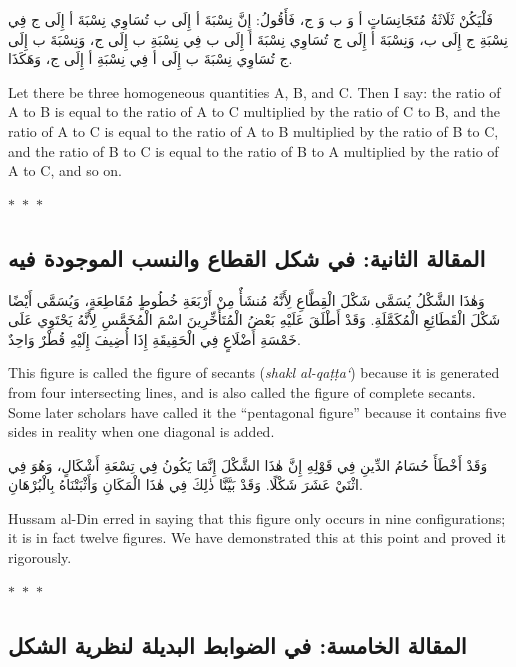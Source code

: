 \documentclass[11pt,a4paper]{article}
\theoremstyle{plain}
\theoremstyle{definition}
\theoremstyle{remark}
\newcommand{\ar}[1]{{\arabicfont\beginR #1\endR}}
\newcommand{\bilingualpair}[2]{%
  \par\noindent
  \begin{minipage}[t]{0.48\textwidth}
  #1
  \end{minipage}%
  \hfill
  \begin{minipage}[t]{0.48\textwidth}
  \vspace*{0pt}#2
  \end{minipage}\par\vspace{0.3cm}%
}
\newcommand{\ornament}{\begin{center}\textcolor{goldaccent}{$\ast$~$\ast$~$\ast$}\end{center}}
\begin{document}
\vspace{0.3cm}

\bilingualpair{\ar{فَلْيَكُنْ ثَلَاثَةُ مُتَجَانِسَاتٍ أ وَ ب وَ ج، فَأَقُولُ: إِنَّ نِسْبَةَ أ إِلَى ب تُسَاوِي نِسْبَةَ أ إِلَى ج فِي نِسْبَةِ ج إِلَى ب، وَنِسْبَةَ أ إِلَى ج تُسَاوِي نِسْبَةَ أ إِلَى ب فِي نِسْبَةِ ب إِلَى ج، وَنِسْبَةَ ب إِلَى ج تُسَاوِي نِسْبَةَ ب إِلَى أ فِي نِسْبَةِ أ إِلَى ج، وَهَكَذَا.}}{Let there be three homogeneous quantities A, B, and C. Then I say: the ratio of A to B is equal to the ratio of A to C multiplied by the ratio of C to B, and the ratio of A to C is equal to the ratio of A to B multiplied by the ratio of B to C, and the ratio of B to C is equal to the ratio of B to A multiplied by the ratio of A to C, and so on.}

\ornament

\subsection*{\ar{المقالة الثانية: في شكل القطاع والنسب الموجودة فيه}}

\bilingualpair{\ar{وَهٰذَا الشَّكْلُ يُسَمَّى شَكْلَ الْقِطَّاعِ لِأَنَّهُ مُنشَأٌ مِنْ أَرْبَعَةِ خُطُوطٍ مُقَاطِعَةٍ، وَيُسَمَّى أَيْضًا شَكْلَ الْقَطَائِعِ الْمُكَمَّلَةِ. وَقَدْ أَطْلَقَ عَلَيْهِ بَعْضُ الْمُتَأَخِّرِينَ اسْمَ الْمُخَمَّسِ لِأَنَّهُ يَحْتَوِي عَلَى خَمْسَةِ أَضْلَاعٍ فِي الْحَقِيقَةِ إِذَا أُضِيفَ إِلَيْهِ قُطْرٌ وَاحِدٌ.}}{This figure is called the figure of secants (\textit{shakl al-qa\d{t}\d{t}a`}) because it is generated from four intersecting lines, and is also called the figure of complete secants. Some later scholars have called it the ``pentagonal figure'' because it contains five sides in reality when one diagonal is added.}

\vspace{0.3cm}

\bilingualpair{\ar{وَقَدْ أَخْطَأَ حُسَامُ الدِّينِ فِي قَوْلِهِ إِنَّ هٰذَا الشَّكْلَ إِنَّمَا يَكُونُ فِي تِسْعَةِ أَشْكَالٍ، وَهُوَ فِي اثْنَيْ عَشَرَ شَكْلًا. وَقَدْ بَيَّنَّا ذٰلِكَ فِي هٰذَا الْمَكَانِ وَأَثْبَتْنَاهُ بِالْبُرْهَانِ.}}{Hussam al-Din erred in saying that this figure only occurs in nine configurations; it is in fact twelve figures. We have demonstrated this at this point and proved it rigorously.}

\ornament

\subsection*{\ar{المقالة الخامسة: في الضوابط البديلة لنظرية الشكل}}
\end{document}
